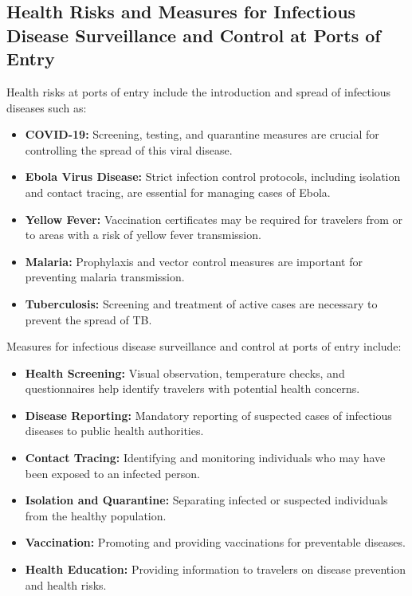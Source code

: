 \documentclass[12pt,a4paper]{article}
\begin{document}
\subsection*{Health Risks and Measures for Infectious Disease Surveillance and Control at Ports of Entry}
Health risks at ports of entry include the introduction and spread of infectious diseases such as:
\begin{itemize}
    \item \textbf{COVID-19:} Screening, testing, and quarantine measures are crucial for controlling the spread of this viral disease.
    \item \textbf{Ebola Virus Disease:} Strict infection control protocols, including isolation and contact tracing, are essential for managing cases of Ebola.
    \item \textbf{Yellow Fever:} Vaccination certificates may be required for travelers from or to areas with a risk of yellow fever transmission.
    \item \textbf{Malaria:} Prophylaxis and vector control measures are important for preventing malaria transmission.
    \item \textbf{Tuberculosis:} Screening and treatment of active cases are necessary to prevent the spread of TB.
\end{itemize}

Measures for infectious disease surveillance and control at ports of entry include:
\begin{itemize}
    \item \textbf{Health Screening:} Visual observation, temperature checks, and questionnaires help identify travelers with potential health concerns.
    \item \textbf{Disease Reporting:} Mandatory reporting of suspected cases of infectious diseases to public health authorities.
    \item \textbf{Contact Tracing:} Identifying and monitoring individuals who may have been exposed to an infected person.
    \item \textbf{Isolation and Quarantine:} Separating infected or suspected individuals from the healthy population.
    \item \textbf{Vaccination:} Promoting and providing vaccinations for preventable diseases.
    \item \textbf{Health Education:} Providing information to travelers on disease prevention and health risks.
\end{itemize}
\end{document}
